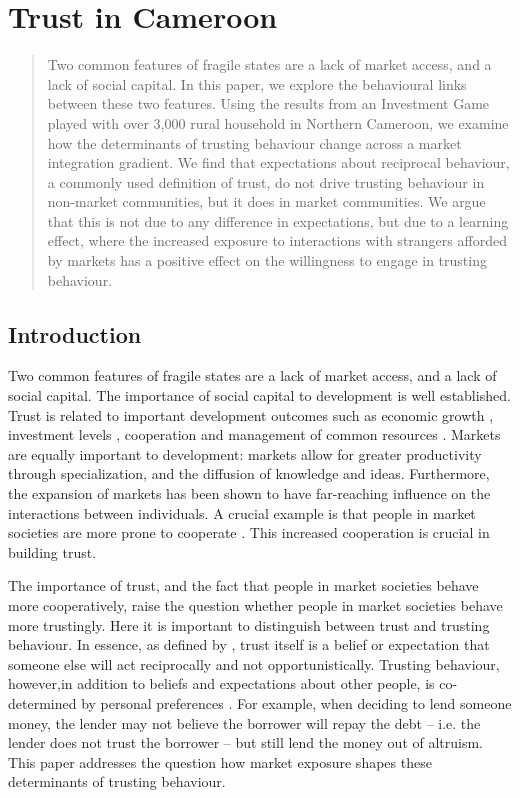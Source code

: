 \chapter{Trust in Cameroon}
\label{chap:cameroontrust}

\begin{abstract}
Two common features of fragile states are a lack of market access, and a lack of social capital. In this paper, we explore the behavioural links between these two features. Using the results from an Investment Game played with over 3,000 rural household in Northern Cameroon, we examine how the determinants of trusting behaviour change across a market integration gradient. We find that expectations about reciprocal behaviour, a commonly used definition of trust, do not drive trusting behaviour in non-market communities, but it does in market communities. We argue that this is not due to any difference in expectations, but due to a learning effect, where the increased exposure to interactions with strangers afforded by markets has a positive effect on the willingness to engage in trusting behaviour.
\end{abstract}


\section{Introduction}

Two common features of fragile states are a lack of market access, and a lack of social capital. The importance of social capital to development is well established. Trust is related to important development outcomes such as economic growth \citep{Knack1997}, investment levels \citep{Zak2001}, cooperation \citep{Gachter2004,Sonderskov2011} and management of common resources \citep{Bouma2008}. Markets are equally important to development: markets allow for greater productivity through specialization, and the diffusion of knowledge and ideas. Furthermore, the expansion of markets has been shown to have far-reaching influence on the interactions between individuals. A crucial example is that people in market societies are more prone to cooperate \citep{Henrich2010}. This increased cooperation is crucial in building trust.

The importance of trust, and the fact that people in market societies behave more cooperatively, raise the question whether people in market societies behave more trustingly. Here it is important to distinguish between trust and trusting behaviour. In essence, as defined by \cite{Gambetta2000}, trust itself is a belief or expectation that someone else will act reciprocally and not opportunistically. Trusting behaviour, however,in addition to beliefs and expectations about other people, is co-determined by personal preferences \citep{Sapienza2013}. For example, when deciding to lend someone money, the lender may not believe the borrower will repay the debt -- i.e. the lender does not trust the borrower -- but still lend the money out of altruism. This paper addresses the question how market exposure shapes these determinants of trusting behaviour.

